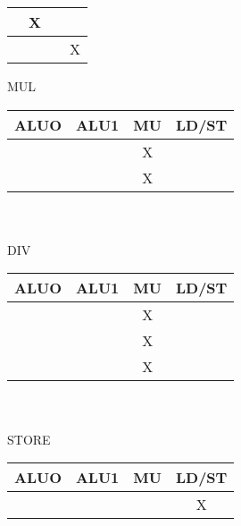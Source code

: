 \documentclass{report}
\begin{document}
\begin{multicols}{3}
\begin{tabular}{|c|c|c|c|}
  \hline
       & X    &    &      \\
  \hline 
        &     &    & X    \\
  \hline
\end{tabular}
  \vfill\columnbreak
MUL \\
\begin{tabular}{|c|c|c|c|}
  \hline
  ALUO & ALU1 & MU & LD/ST \\
  \hline
       &      & X  &       \\
  \hline
       &      & X  &       \\
  \hline
\end{tabular} \\ \ \\
DIV \\
\begin{tabular}{|c|c|c|c|}
  \hline
  ALUO & ALU1 & MU & LD/ST \\
  \hline
       &      & X  &       \\
  \hline
       &      & X  &       \\
  \hline
       &      & X  &       \\
  \hline
\end{tabular} \\ \ \\
STORE \\
\begin{tabular}{|c|c|c|c|}
  \hline
  ALUO & ALU1 & MU & LD/ST \\
  \hline
       &      &    & X     \\
  \hline
\end{tabular}
\end{multicols}


\newpage
\end{document}
